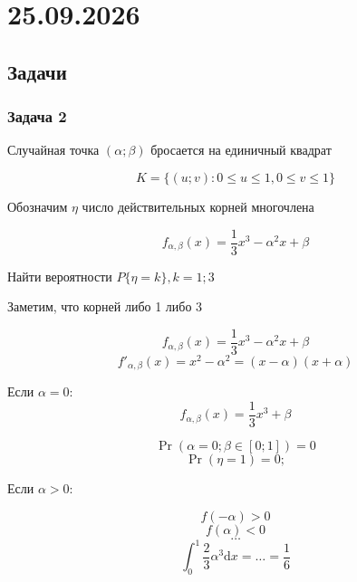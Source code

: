 \section{25.09.2026}

\subsection{Задачи}

\subsubsection{Задача 2}

\begin{task}
Случайная точка $(\alpha; \beta)$ бросается на единичный квадрат

\[
    K = \{(u; v) : 0 \leq u \leq 1, 0 \leq v \leq 1\}
\]

Обозначим $\eta  $ число действительных корней многочлена

\[
    f_{\alpha, \beta } (x) = \frac{1}{3} x^3 - \alpha ^ 2 x + \beta 
\]

Найти вероятности $P \{\eta = k\}, k = 1;3$
\end{task}

\begin{solution}
Заметим, что корней либо 1 либо 3

\[
    f_{\alpha, \beta } (x) = \frac{1}{3} x^3 - \alpha ^ 2 x + \beta 
\]
\[
    f'_{\alpha, \beta } (x) = x^2 - \alpha ^ 2 = (x - \alpha )(x + \alpha )
\]

Если $\alpha = 0$: 
\[
    f_{\alpha, \beta } (x) = \frac{1}{3} x^3 + \beta 
\]

\[
    \Pr_{}(\alpha = 0; \beta \in [0; 1]) = 0 
\]
\[
    \Pr_{}(\eta = 1) = 0; 
\]

Если $\alpha > 0$: 

\[
    f(-\alpha ) > 0
\]
\[
    f(\alpha ) < 0
\]
\[
    \ldots
\]
\[
    \int_0^1 \frac{2}{3} \alpha ^3 \mathrm{d} x = \ldots = \frac{1}{6}
\]
\end{solution}
